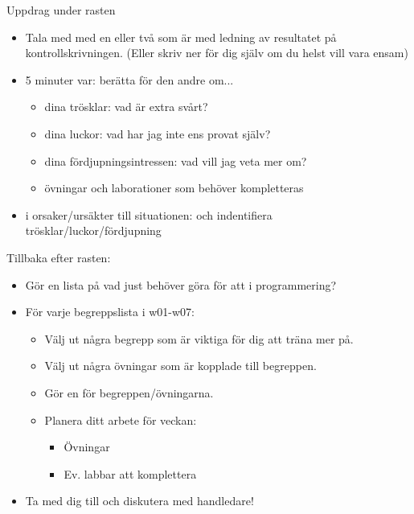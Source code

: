\begin{Slide}{Uppdrag under rasten}
\begin{itemize}
\item Tala med med en eller två som är  med ledning av resultatet på kontrollskrivningen. (Eller skriv ner för dig själv om du helst vill vara ensam)

\item 5 minuter var: berätta för den andre om...
\begin{itemize}
 \item dina trösklar: vad är extra svårt?
 \item dina luckor: vad har jag inte ens provat själv?
 \item dina fördjupningsintressen: vad vill jag veta mer om?
 \item övningar och laborationer som behöver kompletteras
\end{itemize}
\item {} i orsaker/ursäkter till situationen:  och  indentifiera trösklar/luckor/fördjupning
\end{itemize}
\end{Slide}


\begin{Slide}{Tillbaka efter rasten:}
\begin{itemize}
\item Gör en lista på vad just  behöver göra för att  i programmering?
\item För varje begreppslista i w01-w07:
\begin{itemize}
\item Välj ut några begrepp som är viktiga för dig att träna mer på.
\item Välj ut några övningar som är kopplade till begreppen.
\item Gör en  för begreppen/övningarna.
\item Planera ditt arbete för veckan:
\begin{itemize}
\item Övningar
\item Ev. labbar att komplettera
\end{itemize}
\end{itemize}
\item Ta med dig  till  och diskutera med handledare!
\end{itemize}
\end{Slide}


